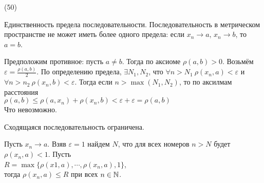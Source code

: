 (50)

\T \q Единственность предела последовательности. Последовательность в метрическом пространстве не может иметь более одного предела: если $x_n \to a$, $x_n \to b$, то $a = b$.

\D Предположим противное: пусть $a \neq b$. Тогда по аксиоме $\rho(a, b) > 0$. Возьмём $\varepsilon = \frac{\rho(a, b)}{2}$. По определению предела, $\exists N_1, N_2$, что $\forall n > N_1\ \rho(x_n, a) < \varepsilon$ и $\forall n > n_2\ \rho(x_n, b) < \varepsilon$. Тогда если $n > \max(N_1, N_2)$, то по аксилмам расстояния\\
$\rho(a, b) \le \rho(a, x_n) + \rho(x_n, b) < \varepsilon + \varepsilon = \rho(a, b)$\\
Что невозможно.

\T Сходящаяся последовательность ограничена.

\D Пусть $x_n \to a$. Взяв $\varepsilon = 1$ найдем $N$, что для всех номеров $n > N$ будет $\rho(x_n, a) < 1$. Пусть\\
$R = \max\{\rho(x1, a), \cdots, \rho(x_n, a), 1\}$,\\
тогда $\rho(x_n, a) \le R$ при всех $n \in \mathbb{N}$.